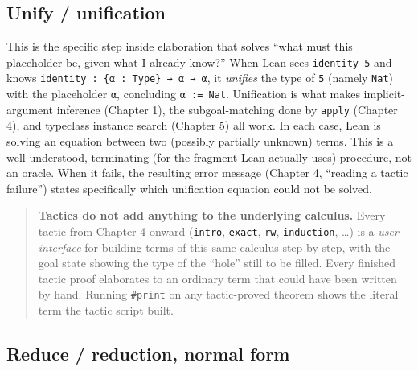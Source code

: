 \subsection{Unify / unification}\label{sec:01-basics:04-terminology:3}

This is the specific step inside elaboration that solves ``what must this placeholder be, given what I already know?'' When Lean sees \texttt{identity 5} and knows \texttt{identity : \{α : Type\} → α → α}, it \emph{unifies} the type of \texttt{5} (namely \texttt{Nat}) with the placeholder \texttt{α}, concluding \texttt{α := Nat}. Unification is what makes implicit-argument inference (Chapter 1), the subgoal-matching done by \texttt{apply} (Chapter 4), and typeclass instance search (Chapter 5) all work. In each case, Lean is solving an equation between two (possibly partially unknown) terms. This is a well-understood, terminating (for the fragment Lean actually uses) procedure, not an oracle. When it fails, the resulting error message (Chapter 4, ``reading a tactic failure'') states specifically which unification equation could not be solved.

\begin{quote}
\textbf{Tactics do not add anything to the underlying calculus.} Every tactic from Chapter 4 onward (\href{https://lean-lang.org/doc/reference/latest/Tactic-Proofs/Tactic-Reference/}{\texttt{intro}}, \href{https://lean-lang.org/doc/reference/latest/Tactic-Proofs/Tactic-Reference/}{\texttt{exact}}, \href{https://lean-lang.org/doc/reference/latest/Tactic-Proofs/Tactic-Reference/}{\texttt{rw}}, \href{https://lean-lang.org/doc/reference/latest/Tactic-Proofs/Tactic-Reference/}{\texttt{induction}}, \ldots) is a \emph{user interface} for building terms of this same calculus step by step, with the goal state showing the type of the ``hole'' still to be filled. Every finished tactic proof elaborates to an ordinary term that could have been written by hand. Running \texttt{\#print} on any tactic-proved theorem shows the literal term the tactic script built.
\end{quote}

\subsection{Reduce / reduction, normal form}\label{sec:01-basics:04-terminology:4}


